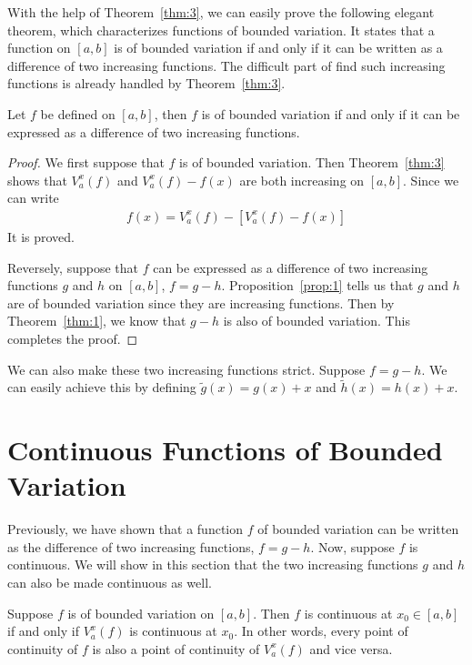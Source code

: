 \documentclass[thmcnt=section, color=blue, 12pt]{my-elegantbook}
\begin{document}
With the help of Theorem~\ref{thm:3}, we can easily prove
the following elegant theorem,
which characterizes functions of bounded variation.
It states that a function on $[a, b]$ is of bounded variation
if and only if it can be written as a difference of two increasing functions.
The difficult part of find such increasing functions
is already handled by Theorem~\ref{thm:3}.

\begin{theorem} \label{thm:4}
	Let $f$ be defined on $[a, b]$,
	then $f$ is of bounded variation if and only if
	it can be expressed as a difference of two
	increasing functions.
\end{theorem}

\begin{proof}
	We first suppose that $f$ is of bounded variation.
	Then Theorem~\ref{thm:3} shows that $V_a^x(f)$
	and $V_a^x(f) - f(x)$ are both increasing on $[a, b]$.
	Since we can write
	\begin{align*}
		f(x) = V_a^x(f) - [ V_a^x (f) - f(x)]
	\end{align*}
	It is proved.

	Reversely, suppose that $f$ can be expressed as a difference of
	two increasing functions $g$ and $h$ on $[a, b]$, $f = g - h$.
	Proposition~\ref{prop:1} tells us that $g$ and $h$ are of bounded variation
	since they are increasing functions.
	Then by Theorem~\ref{thm:1}, we know that $g - h$ is also of bounded variation.
	This completes the proof.
\end{proof}

\begin{note}
	We can also make these two increasing functions strict.
	Suppose $f = g - h$.
	We can easily achieve this by defining $\tilde{g}(x) = g(x) + x$
	and $\tilde{h}(x) = h(x) + x$.
\end{note}

\section{Continuous Functions of Bounded Variation}

Previously, we have shown that a function $f$ of bounded variation can be
written as the difference of two increasing functions, $f = g - h$.
Now, suppose $f$ is continuous.
We will show in this section that the two increasing functions $g$ and $h$
can also be made continuous as well.

\begin{theorem}
	Suppose $f$ is of bounded variation on $[a, b]$.
	Then $f$ is continuous at $x_0 \in [a, b]$
	if and only if $V_a^x(f)$ is continuous at $x_0$.
	In other words, every point of continuity of $f$ is also
	a point of continuity of $V_a^x(f)$ and vice versa.
\end{theorem}
\end{document}

